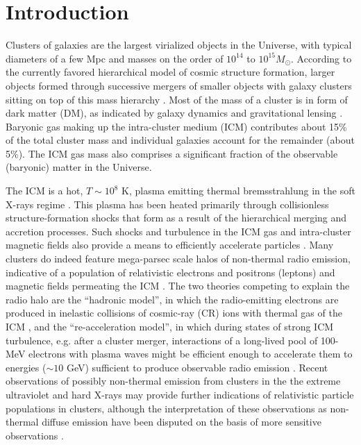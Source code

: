 \documentclass[12pt,manuscript]{aastex}
\begin{document}
%
%

\section{Introduction}
Clusters of galaxies are the largest virialized objects in the Universe, with typical diameters of
a few Mpc and masses on the order of $10^{14}$ to $10^{15} M_{\odot}$. According to the currently
favored hierarchical model of cosmic structure formation, larger objects formed through successive
mergers of smaller objects with galaxy clusters sitting on top of this mass hierarchy
\citep[see][for a review]{article:Voit:2005}. Most of the mass of a cluster is in form of dark
matter (DM), as indicated by galaxy dynamics and gravitational lensing
\citep{article:DiaferioSchindlerDolag:2008}. Baryonic gas making up the intra-cluster medium (ICM)
contributes about 15\% of the total cluster mass and individual galaxies account for the remainder
(about 5\%). The ICM gas mass also comprises a significant fraction of the observable (baryonic)
matter in the Universe.

The ICM is a hot, $T\sim 10^{8}$ K, plasma emitting thermal bremsstrahlung in the soft
X-rays regime \citep[see, e.g.,][]{article:Petrosian:2001}. This plasma has been heated
primarily through collisionless structure-formation shocks that form as a result of the
hierarchical merging and accretion processes. Such shocks and turbulence in the ICM gas and
intra-cluster magnetic fields also provide a means to efficiently accelerate particles \citep[see,
e.g.,][]{article:ColafrancescoBlasi:1998, article:Ryu_etal:2003}. Many clusters do indeed feature
mega-parsec scale halos of non-thermal radio emission, indicative of a population of relativistic
electrons and positrons (leptons) and magnetic fields permeating the ICM
\citep{article:Cassano_etal:2010}. The two theories competing to explain the radio halo
are the ``hadronic model'', in which the radio-emitting electrons are produced in inelastic
collisions of cosmic-ray (CR)  ions with thermal gas of the ICM \citep{article:Dennison:1980},
and the ``re-acceleration model'', in which during states of strong ICM turbulence, e.g. after a
cluster merger, interactions of a long-lived pool of 100-MeV electrons with plasma waves might
be efficient enough to accelerate them to energies ($\sim 10$ GeV) sufficient to produce observable
radio emission \citep[][and references therein]{article:BrunettiLazarian:2010}. Recent observations of
possibly non-thermal emission from clusters in the the extreme ultraviolet
\citep[EUV; ][]{article:SarazinLieu:1998} and hard X-rays \citep{article:RephaeliGruber:2002, article:Fusco-Femiano_etal:2004, article:Eckert_etal:2007} may provide further indications of
relativistic particle populations in clusters, although the interpretation of these observations as non-thermal diffuse emission have been disputed on the basis of more sensitive observations
\citep[see, e.g.,][]{article:Ajello_etal:2009, article:Ajello_etal:2010, article:Wik_etal:2009}.
\end{document}
